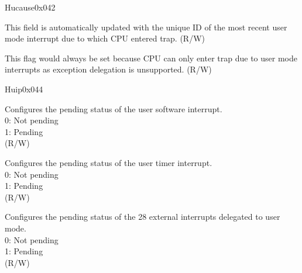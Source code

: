 \begin{register}{H}{ucause}{0x042}\label{regdesc:UCAUSE}
%
%
%
\regnewline%
\begin{regdesc}\begin{reglist}
\label{fielddesc:UCAUSECODE}\item [Interrupt ID] This field is automatically updated with the unique ID of the most recent user mode interrupt due to which CPU entered trap. (R/W)
\label{fielddesc:UCAUSEINT}\item [Interrupt Flag] This flag would always be set because CPU can only enter trap due to user mode interrupts as exception delegation is unsupported. (R/W)
\end{reglist}\end{regdesc}
\end{register}

\begin{register}{H}{uip}{0x044}\label{regdesc:UIP}
%
%
%
%
%
%
%
\regnewline%
\begin{regdesc}\begin{reglist}
\label{fielddesc:UIPUSIP}\item [USIP] Configures the pending status of the user software interrupt. \\
0: Not pending\\
1: Pending\\
(R/W)
\label{fielddesc:UIPUTIP}\item [UTIP] Configures the pending status of the user timer interrupt. \\
0: Not pending\\
1: Pending\\
(R/W)
\label{fielddesc:UIPUXIP}\item [UXIP] Configures the pending status of the 28 external interrupts delegated to user mode. \\
0: Not pending\\
1: Pending\\
(R/W)
\end{reglist}\end{regdesc}
\end{register}

